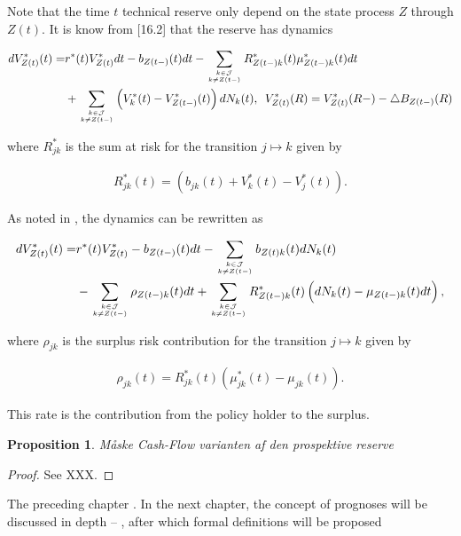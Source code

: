 \documentclass{book}
\newcommand{\1}[1]{\mathbbm{1}_{\left\lbrace #1 \right\rbrace}}
\theoremstyle{break}
\newtheorem{proposition}[definition]{Proposition}%
\theoremstyle{remark}
\numberwithin{equation}{section}
\begin{document}
Note that the time $t$ technical reserve only depend on the state process $Z$ through $Z(t)$. It is know from \cite{Livstok}[16.2] that the reserve has dynamics

\begin{align*}
	dV_{Z(t)}^*(t) =& r^*(t) V_{Z(t)}^* dt - b_{Z(t-)}(t) dt - \sum_{k \in \mathcal{J} \atop k \neq Z(t-)} R_{Z(t-)k}^*(t) \mu_{Z(t-)k}^*(t) dt \\
	&+ \sum_{k \in \mathcal{J} \atop k \neq Z(t-)} \left( V_k^*(t) - V_{Z(t-)}^*(t) \right) dN_k(t), \, \, \, V_{Z(t)}^*(R) =  V_{Z(t)}^*(R-) - \triangle B_{Z(t-)}(R)
\end{align*}

where $R_{jk}^*$ is the sum at risk for the transition $j \mapsto k$ given by

\begin{align*}
	R_{jk}^*(t) = \left( b_{jk}(t) + V_{k}^*(t) - V_{j}^*(t) \right).
\end{align*}

As noted in \cite{Lollike}, the dynamics can be rewritten as

\begin{align} \label{ReserveDynamics}
\begin{split}
	dV_{Z(t)}^*(t) =& r^*(t) V_{Z(t)}^* - b_{Z(t-)}(t) dt - \sum_{k \in \mathcal{J} \atop k \neq Z(t-)} b_{Z(t)k}(t) dN_k(t) \\
	&- \sum_{k \in \mathcal{J} \atop k \neq Z(t-)} \rho_{Z(t-)k}(t) dt + \sum_{k \in \mathcal{J} \atop k \neq Z(t-)} R_{Z(t-)k}^*(t) \left( dN_k(t) - \mu_{Z(t-)k}(t) dt \right),
\end{split}
\end{align}

where $\rho_{jk}$ is the surplus risk contribution for the transition $j \mapsto k$ given by

\begin{align*}
	\rho_{jk}(t) = R_{jk}^*(t) \left( \mu_{jk}^*(t) - \mu_{jk}(t) \right).
\end{align*}

This rate is the contribution from the policy holder to the surplus.

\begin{proposition}
	Måske Cash-Flow varianten af den prospektive reserve
\end{proposition}

\begin{proof}
	See XXX.
\end{proof}

The preceding chapter . In the next chapter, the concept of prognoses will be discussed in depth -- , after which formal definitions will be proposed
\end{document}
